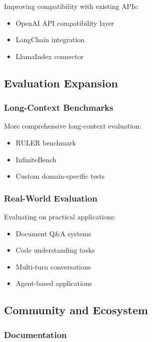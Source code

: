 Improving compatibility with existing APIs:

\begin{itemize}
    \item OpenAI API compatibility layer
    \item LangChain integration
    \item LlamaIndex connector
\end{itemize}

\subsection{Evaluation Expansion}

\subsubsection{Long-Context Benchmarks}

More comprehensive long-context evaluation:

\begin{itemize}
    \item RULER benchmark
    \item InfiniteBench
    \item Custom domain-specific tests
\end{itemize}

\subsubsection{Real-World Evaluation}

Evaluating on practical applications:

\begin{itemize}
    \item Document Q\&A systems
    \item Code understanding tasks
    \item Multi-turn conversations
    \item Agent-based applications
\end{itemize}

\subsection{Community and Ecosystem}

\subsubsection{Documentation}


